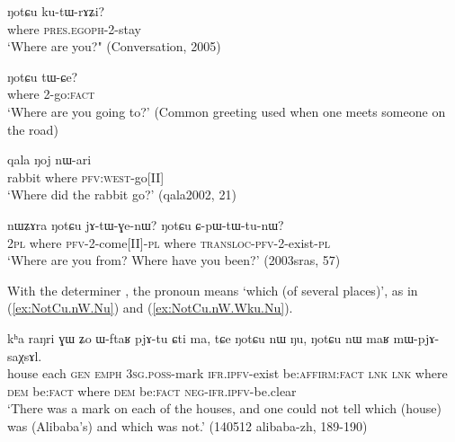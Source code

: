 \begin{exe}
\ex \label{ex:NotCu.kutWrAZi}
\gll     ŋotɕu ku-tɯ-rɤʑi?   \\
  where \textsc{pres.egoph}-2-stay \\
\glt `Where are you?" (Conversation, 2005)
\end{exe} 

\begin{exe}
\ex \label{ex:NotCu.tWCe}
\gll   ŋotɕu tɯ-ɕe? \\
 where 2-go:\textsc{fact} \\
\glt `Where are you going to?' (Common greeting used when one meets someone on the road)
 \end{exe} 
 
\begin{exe}
\ex \label{ex:Noj.nari}
\gll     qala ŋoj nɯ-ari  \\
  rabbit where \textsc{pfv:west}-go[II] \\
\glt `Where did the rabbit go?'  (qala2002, 21)
\end{exe} 

\begin{exe}
\ex \label{ex:NotCu.jAtWGenW}
\gll  nɯʑɤra ŋotɕu jɤ-tɯ-ɣe-nɯ? ŋotɕu ɕ-pɯ-tɯ-tu-nɯ? \\
\textsc{2pl} where \textsc{pfv}-2-come[II]-\textsc{pl} where \textsc{transloc-pfv}-2-exist-\textsc{pl} \\
\glt `Where are you from? Where have you been?' (2003sras, 57)
\end{exe} 

With the determiner , the pronoun  means `which (of several places)', as in (\ref{ex:NotCu.nW.Nu}) and (\ref{ex:NotCu.nW.Wku.Nu}).

\begin{exe}
\ex \label{ex:NotCu.nW.Nu}
\gll kʰa raŋri ɣɯ ʑo ɯ-ftaʁ pjɤ-tu ɕti ma, tɕe ŋotɕu nɯ ŋu, ŋotɕu nɯ maʁ mɯ-pjɤ-saχsɤl. \\
house each \textsc{gen} \textsc{emph} \textsc{3sg.poss}-mark \textsc{ifr.ipfv}-exist be:\textsc{affirm:fact} \textsc{lnk} \textsc{lnk} where \textsc{dem} be:\textsc{fact}  where \textsc{dem} be:\textsc{fact} \textsc{neg-ifr.ipfv}-be.clear \\
\glt `There was a mark on each of the houses, and one could not tell which (house) was (Alibaba's) and which was not.' (140512 alibaba-zh, 189-190)
\end{exe} 

